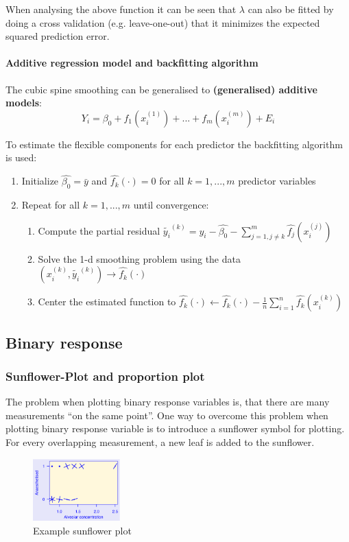 When analysing the above function it can be seen that $\lambda$ can also be fitted by doing a cross validation (e.g. leave-one-out) that it minimizes the expected squared prediction error.

\paragraph{Additive regression model and backfitting algorithm}
The cubic spine smoothing can be generalised to \textbf{(generalised) additive models}:
\begin{equation*}
Y_i = \beta_0 + f_1(x_i^{(1)}) + ... + f_m(x_i^{(m)}) + E_i
\end{equation*}

To estimate the flexible components for each predictor the backfitting algorithm is used:
\begin{enumerate}
	\tightlist
	\item Initialize $\hat{\beta_0} = \bar{y}$ and $\hat{f_k}(\cdot)=0$ for all $k=1, ..., m$ predictor variables
	\item Repeat for all $k=1, ..., m$ until convergence:
	\begin{enumerate}
		\tightlist
		\item Compute the partial residual $\tilde{y_i}^{(k)} = y_i - \hat{\beta_0}-\sum_{j=1, j\neq k}^{m} \hat{f_j}(x_i^{(j)})$
		\item Solve the 1-d smoothing problem using the data $(x_i^{(k)}, \tilde{y_i}^{(k)}) \rightarrow \hat{f_k}(\cdot)$
		\item Center the estimated function to $\hat{f_k}(\cdot) \leftarrow \hat{f_k}(\cdot) - \frac{1}{n} \sum_{i=1}^{n} \hat{f_k}(x_i^{(k)})$
	\end{enumerate}
\end{enumerate}

\subsection{Binary response}

\subsubsection{Sunflower-Plot and proportion plot}

The problem when plotting binary response variables is, that there are many measurements ``on the same point''. One way to overcome this problem when plotting binary response variable is to introduce a sunflower symbol for plotting. For every overlapping measurement, a new leaf is added to the sunflower.
\begin{figure}[H]
	\centering
	\includegraphics[width=0.3\textwidth]{images/sunflower.png}
	\caption{Example sunflower plot}
\end{figure}

